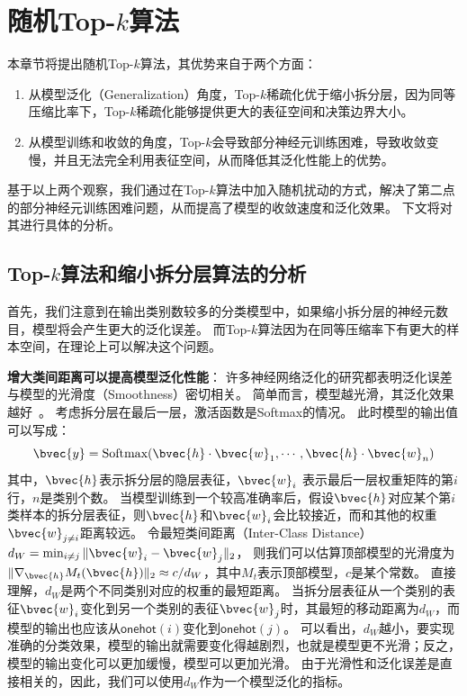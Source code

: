 \section{随机Top-$k$算法}
\label{sec:randomized_topk:method}
本章节将提出随机Top-$k$算法，其优势来自于两个方面：
\begin{enumerate}
    \item 从模型泛化（Generalization）角度，Top-$k$稀疏化优于缩小拆分层，因为同等压缩比率下，Top-$k$稀疏化能够提供更大的表征空间和决策边界大小。
    \item 从模型训练和收敛的角度，Top-$k$会导致部分神经元训练困难，导致收敛变慢，并且无法完全利用表征空间，从而降低其泛化性能上的优势。
\end{enumerate}
%
基于以上两个观察，我们通过在Top-$k$算法中加入随机扰动的方式，解决了第二点的部分神经元训练困难问题，从而提高了模型的收敛速度和泛化效果。
%
下文将对其进行具体的分析。

\subsection{Top-$k$算法和缩小拆分层算法的分析}
首先，我们注意到在输出类别数较多的分类模型中，如果缩小拆分层的神经元数目，模型将会产生更大的泛化误差。
而Top-$k$算法因为在同等压缩率下有更大的样本空间，在理论上可以解决这个问题。


\textbf{增大类间距离可以提高模型泛化性能}：
许多神经网络泛化的研究都表明泛化误差与模型的光滑度（Smoothness）密切相关。
%
简单而言，模型越光滑，其泛化效果越好~\cite{neysharbur2015norm_capacity,neysharbur2017generalization,gouk2021lipschitz_reg}。
%
考虑拆分层在最后一层，激活函数是Softmax的情况。
此时模型的输出值可以写成：
\begin{equation}
    \bvec{y} = \text{Softmax}(\bvec{h}\cdot \bvec{w}_1, \cdots, \bvec{h} \cdot \bvec{w}_n)
\end{equation}
其中，$\bvec{h}$表示拆分层的隐层表征，$\bvec{w}_i$ 表示最后一层权重矩阵的第$i$行，$n$是类别个数。
%
当模型训练到一个较高准确率后，假设$\bvec{h}$对应某个第$i$类样本的拆分层表征，则$\bvec{h}$和$\bvec{w}_i$会比较接近，而和其他的权重$\bvec{w}_{j\ne i}$距离较远。
%
令最短类间距离（Inter-Class Distance）$d_W = \min_{i\ne j} \Vert \bvec{w}_i - \bvec{w}_j \Vert_2$，
则我们可以估算顶部模型的光滑度为$\Vert \nabla_{\bvec{h}} M_t(\bvec{h}) \Vert_2 \approx c/d_W$，其中$M_t$表示顶部模型，$c$是某个常数。
%
直接理解，$d_W$是两个不同类别对应的权重的最短距离。
当拆分层表征从一个类别的表征$\bvec{w}_i$变化到另一个类别的表征$\bvec{w}_j$时，其最短的移动距离为$d_W$，而模型的输出也应该从$\mathsf{onehot}(i)$变化到$\mathsf{onehot}(j)$。
%
可以看出，$d_W$越小，要实现准确的分类效果，模型的输出就需要变化得越剧烈，也就是模型更不光滑；反之，模型的输出变化可以更加缓慢，模型可以更加光滑。
%
由于光滑性和泛化误差是直接相关的，因此，我们可以使用$d_W$作为一个模型泛化的指标。
%


